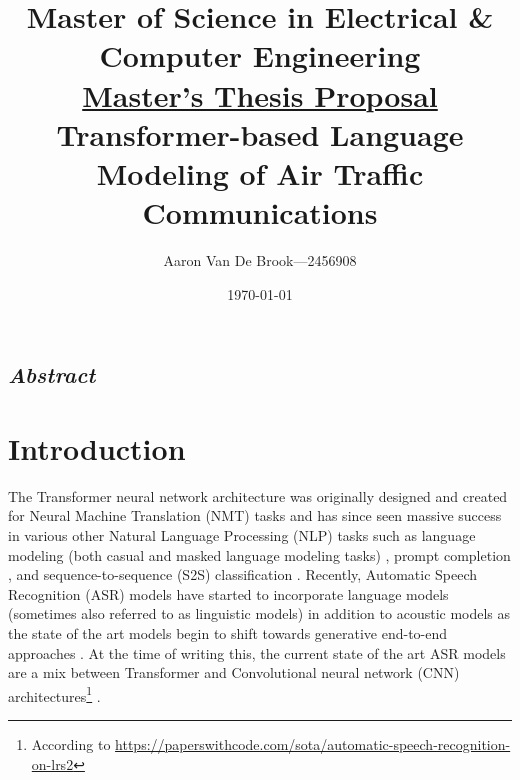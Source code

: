 \documentclass{article}
\title{
    Master of Science in Electrical \& Computer Engineering\\
    \underline{Master's Thesis Proposal}\\
    Transformer-based Language Modeling of Air Traffic Communications
}
\author{Aaron Van De Brook---2456908}
\date{\today}
\begin{document}
    \maketitle

    \begin{center}
        \section*{\textit{Abstract}}
        \justifying
        \textit{\lipsum[1]}
    \end{center}

    \section{Introduction}
        The Transformer neural network architecture was originally designed and created for Neural Machine
        Translation (NMT) tasks \cite{vaswani_attention_2017} and has since seen massive success in various
        other Natural Language Processing (NLP) tasks such as language modeling (both casual and masked language
        modeling tasks) \cite{devlin_bert_2019}, prompt completion \cite{radford_improving_2018}, and
        sequence-to-sequence (S2S) classification \cite{lewis_bart_2019}.
        Recently, Automatic Speech Recognition (ASR) models have started to incorporate language models
        \cite{badrinath_automatic_2022} (sometimes also referred to as linguistic models) in addition to
        acoustic models \cite{li2019jasper} as the state of the art models begin to shift towards generative
        end-to-end approaches \cite{hannun2014deep}.
        At the time of writing this, the current state of the art ASR models are a mix between Transformer
        and Convolutional neural network (CNN) architectures\footnote{According to
        \url{https://paperswithcode.com/sota/automatic-speech-recognition-on-lrs2}} \cite{baevski2020wav2vec}.
\end{document}
